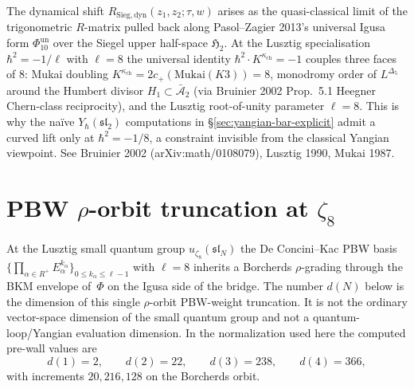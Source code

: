 \begin{remark}
\label{rem:yangcomp-2}
The dynamical shift $R_{\mathrm{Sieg,dyn}}(z_1,z_2;\tau,w)$ arises as
the quasi-classical limit of the trigonometric $R$-matrix pulled back
along Pasol--Zagier 2013's universal Igusa form $\Phi_{10}^{\mathrm{un}}$ over the
Siegel upper half-space $\mathfrak H_2$. At the Lusztig specialisation
$\hbar^2 = -1/\ell$ with $\ell = 8$ the universal identity
$\hbar^2 \cdot K^{\kappa_{\mathrm{ch}}} = -1$ couples three faces of $8$:
Mukai doubling $K^{\kappa_{\mathrm{ch}}} = 2c_+(\mathrm{Mukai}(K3)) = 8$,
monodromy order of $L^{\Delta_5}$ around the Humbert divisor $H_1\subset\bar{\mathcal A}_2$
(via Bruinier 2002 Prop.~5.1 Heegner Chern-class reciprocity), and the
Lusztig root-of-unity parameter $\ell = 8$. This is why the na\"ive
$Y_\hbar(\mathfrak{sl}_2)$ computations in
\S\ref{sec:yangian-bar-explicit} admit a curved lift only at $\hbar^2 = -1/8$,
a constraint invisible from the classical Yangian viewpoint.
See Bruinier 2002 (arXiv:math/0108079), Lusztig 1990, Mukai 1987.
\end{remark}

\section{PBW $\rho$-orbit truncation at \texorpdfstring{$\zeta_8$}{zeta8}}
\label{sec:u-zeta-8-pbw-truncation}

At the Lusztig small quantum group $u_{\zeta_8}(\mathfrak{sl}_N)$ the
De Concini--Kac PBW basis
$\{\prod_{\alpha\in R^+} E_\alpha^{k_\alpha}\}_{0\le k_\alpha\le \ell-1}$
with $\ell = 8$ inherits a Borcherds $\rho$-grading through the BKM
envelope of~$\Phi$ on the Igusa side of the bridge. The number
$d(N)$ below is the dimension of this single $\rho$-orbit
PBW-weight truncation. It is not the ordinary vector-space dimension
of the small quantum group and not a quantum-loop/Yangian evaluation
dimension. In the normalization used here the computed pre-wall
values are
\[
d(1)=2,\qquad d(2)=22,\qquad d(3)=238,\qquad d(4)=366,
\]
with increments $20,216,128$ on the Borcherds orbit.

